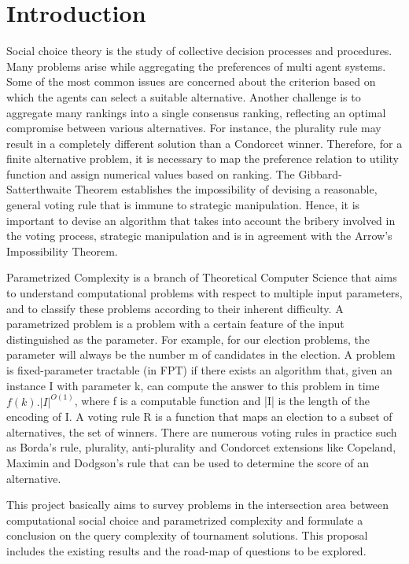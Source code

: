 \documentclass{article}
\begin{document}
\section{Introduction}
Social choice theory is the study of collective decision processes and procedures. Many problems arise while aggregating the preferences of multi agent systems. Some of the most common issues are concerned about the criterion based on which the agents can select a suitable alternative. Another challenge is to aggregate many rankings into a single consensus ranking, reflecting an optimal compromise between various alternatives. For instance, the plurality rule may result in a completely different solution than a Condorcet winner. Therefore, for a finite alternative problem, it is necessary to map the preference relation to utility function and assign numerical values based on ranking. The Gibbard-Satterthwaite Theorem establishes the impossibility of devising a reasonable, general voting rule that is immune to strategic manipulation. Hence, it is important to devise an algorithm that takes into account the bribery involved in the voting process, strategic manipulation and is in agreement with the Arrow's Impossibility Theorem.\par
Parametrized Complexity is a branch of Theoretical Computer Science that aims to understand computational problems with respect to multiple input parameters, and to classify these problems according to their inherent difficulty. A parametrized problem is a problem with a certain feature of the input distinguished as the parameter. For example, for our election problems, the parameter will always be the number m of candidates in the election. A problem is fixed-parameter tractable (in FPT) if there exists an algorithm that, given an instance I with parameter k, can compute the answer to this problem in time \(f(k).|I|^{O(1)}\), where f is a computable function and |I| is the length of the encoding of I. A voting rule R is a function that maps an election to a subset of alternatives, the set of winners. There are numerous voting rules in practice such as Borda's rule, plurality, anti-plurality and Condorcet extensions like Copeland, Maximin and Dodgson's rule that can be used to determine the score of an alternative. \par
This project basically aims to survey problems in the intersection area between computational social choice and parametrized complexity and formulate a conclusion on the query complexity of tournament solutions. This proposal includes the existing results and the road-map of questions to be explored.
\end{document}
